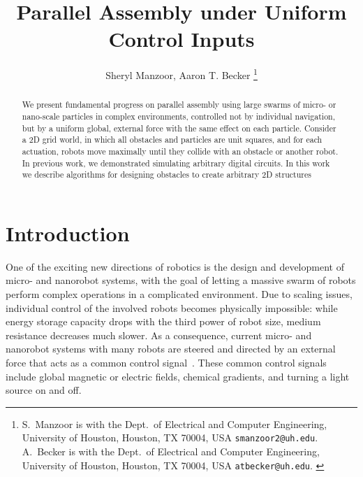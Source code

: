 \documentclass[letterpaper, 10 pt, conference]{ieeeconf}
\begin{document}

\title{\LARGE \bf 
Parallel Assembly under Uniform Control Inputs 
}
\author{
Sheryl Manzoor,
Aaron T. Becker
\thanks{{
S.~Manzoor is with the  Dept.~of Electrical and Computer Engineering,  University of Houston, Houston, TX 70004, USA {\tt\small smanzoor2@uh.edu}.
A.~Becker is with the  Dept.~of Electrical and Computer Engineering,  University of Houston, Houston, TX 70004, USA {\tt\small atbecker@uh.edu}.
}
} %
} %
\maketitle



\begin{abstract} 
We present fundamental progress on parallel assembly using large swarms of micro- or nano-scale particles
in complex environments, controlled not by individual navigation, but by a uniform global, external force with the same effect on each particle.
Consider a 2D grid world, in which all obstacles and particles are unit squares,
and for each actuation, robots move maximally until they collide with an obstacle or another robot. 
 In previous work, we demonstrated simulating  arbitrary digital circuits. 
 In this work we describe algorithms for designing obstacles to create arbitrary 2D structures

\end{abstract}

\section{Introduction}\label{sec:Intro}

One of the exciting new directions of robotics is the design and development
of micro- and nanorobot systems, with the goal of letting a massive swarm of robots
perform complex operations in a complicated environment. Due to scaling 
issues, individual control of the involved robots becomes physically impossible:
while energy storage capacity drops with the third power of robot size,
medium resistance decreases much slower. As a consequence,
current micro- and nanorobot systems with many robots are steered and
directed by an external force that acts as a common control signal~\cite{Donald2013,Chiang2011,Hsi-Wen2012,Diller2013,Jing2013,Ou2013,Lanauze2013}.
These common control signals include global magnetic or electric fields,
chemical gradients, and turning a light source on and off.  
\end{document}
